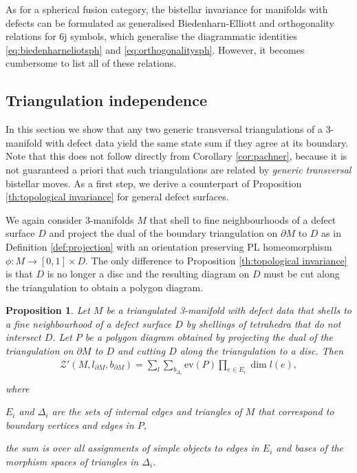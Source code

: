 \documentclass[1.5pt, a4paper]{article}
\newtheorem{proposition}[theorem]{Proposition}
\begin{document}
As for a spherical fusion category, the bistellar invariance for manifolds with defects can  be formulated as generalised  Biedenharn-Elliott and orthogonality relations for  6j symbols, which generalise the diagrammatic identities  \eqref{eq:biedenharneliotsph} and \eqref{eq:orthogonalitysph}. However, it becomes cumbersome to list all of these relations.


\subsection{Triangulation independence}


In this section we  show  that  any two generic transversal triangulations of a  3-manifold with defect data yield the same state sum if they agree at its boundary. 
Note that this does not follow directly from  Corollary \ref{cor:pachner}, because it is not guaranteed a priori  that such triangulations are related by \emph{generic  transversal} bistellar moves. 
As a first step, we derive a counterpart  of Proposition \ref{th:topological invariance}  for general defect surfaces. 

We again consider 3-manifolds $M$  that shell to fine neighbourhoods of a defect surface $D$ and project the dual of the boundary triangulation on $\partial M$  to $D$  as in Definition \ref{def:projection} with an orientation preserving PL homeomorphism $\phi: M\to [0,1]\times D$. The only difference to Proposition \ref{th:topological invariance}  is that $D$ is no longer a disc and the resulting diagram on $D$ must be cut along the triangulation to obtain a polygon diagram.





\begin{proposition}\label{lem:polystatesum}
Let  $M$ be a triangulated 3-manifold with defect data that shells to a fine neighbourhood  of a defect surface $D$ by shellings of tetrahedra that do not intersect $D$. 
Let $P$  be a polygon diagram obtained by projecting the dual of the  triangulation on $\partial M$ to $D$ and  cutting $D$ along the triangulation  to a disc. 
 Then 
\begin{align*}
\mathcal Z'(M,  l_{\partial M}, b_{\partial M})=
\sum_{l}\sum_{b_{\Delta_i}} \mathrm{ev}(P)\prod_{e\in E_{i}} \dim l(e),\\[-6ex]
\end{align*}
where 
\begin{compactitem}
\item $E_{i}$ and $\Delta_i$ are the sets of internal edges and triangles of $M$ that 
 correspond to boundary vertices and edges in $P$, 
\item the sum is over all assignments of simple objects to  edges in $E_i$ and bases of the morphism spaces of  triangles in  $\Delta_i$. 
\end{compactitem}
\end{proposition}
\end{document}
